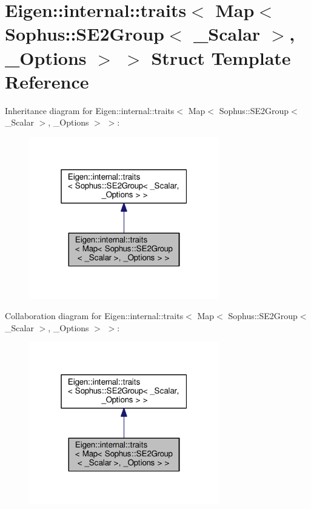 \hypertarget{struct_eigen_1_1internal_1_1traits_3_01_map_3_01_sophus_1_1_s_e2_group_3_01___scalar_01_4_00_01___options_01_4_01_4}{}\section{Eigen\+:\+:internal\+:\+:traits$<$ Map$<$ Sophus\+:\+:S\+E2\+Group$<$ \+\_\+\+Scalar $>$, \+\_\+\+Options $>$ $>$ Struct Template Reference}
\label{struct_eigen_1_1internal_1_1traits_3_01_map_3_01_sophus_1_1_s_e2_group_3_01___scalar_01_4_00_01___options_01_4_01_4}


Inheritance diagram for Eigen\+:\+:internal\+:\+:traits$<$ Map$<$ Sophus\+:\+:S\+E2\+Group$<$ \+\_\+\+Scalar $>$, \+\_\+\+Options $>$ $>$\+:
\nopagebreak
\begin{figure}[H]
\begin{center}
\leavevmode
\includegraphics[width=235pt]{struct_eigen_1_1internal_1_1traits_3_01_map_3_01_sophus_1_1_s_e2_group_3_01___scalar_01_4_00_01_810fbac80203e679e65324f0ff2e4255}
\end{center}
\end{figure}


Collaboration diagram for Eigen\+:\+:internal\+:\+:traits$<$ Map$<$ Sophus\+:\+:S\+E2\+Group$<$ \+\_\+\+Scalar $>$, \+\_\+\+Options $>$ $>$\+:
\nopagebreak
\begin{figure}[H]
\begin{center}
\leavevmode
\includegraphics[width=235pt]{struct_eigen_1_1internal_1_1traits_3_01_map_3_01_sophus_1_1_s_e2_group_3_01___scalar_01_4_00_01_aa767b2a9f583195514bf750c40a08d4}
\end{center}
\end{figure}
